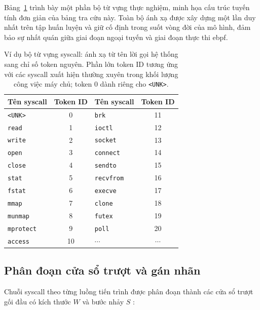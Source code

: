 \documentclass[../main.tex]{subfiles}
\begin{document}
Bảng~\ref{tab:vocab} trình bày một phần bộ từ vựng thực nghiệm, minh
họa cấu trúc
tuyến tính đơn giản của bảng tra cứu này. Toàn bộ ánh xạ được xây
dựng một lần duy
nhất trên tập huấn luyện và giữ cố định trong suốt vòng đời của mô
hình, đảm bảo sự
nhất quán giữa giai đoạn ngoại tuyến và giai đoạn thực thi \gls{ebpf}.

\begin{table}[H]
  \caption{Ví dụ bộ từ vựng syscall: ánh xạ từ tên lời gọi hệ thống
    sang chỉ số token
    nguyên. Phần lớn token ID tương ứng với các syscall xuất hiện
    thường xuyên trong
  khối lượng công việc máy chủ; token 0 dành riêng cho \texttt{<UNK>}.}
  \label{tab:vocab}
  \centering
  \begin{tabular}{|l|c||l|c|}
    \hline
    \textbf{Tên \gls{syscall}} & \textbf{Token ID} &
    \textbf{Tên \gls{syscall}} & \textbf{Token ID} \\ \hline
    \texttt{<UNK>}    & 0  & \texttt{brk}       & 11 \\ \hline
    \texttt{read}     & 1  & \texttt{ioctl}     & 12 \\ \hline
    \texttt{write}    & 2  & \texttt{socket}    & 13 \\ \hline
    \texttt{open}     & 3  & \texttt{connect}   & 14 \\ \hline
    \texttt{close}    & 4  & \texttt{sendto}    & 15 \\ \hline
    \texttt{stat}     & 5  & \texttt{recvfrom}  & 16 \\ \hline
    \texttt{fstat}    & 6  & \texttt{execve}    & 17 \\ \hline
    \texttt{mmap}     & 7  & \texttt{clone}     & 18 \\ \hline
    \texttt{munmap}   & 8  & \texttt{futex}     & 19 \\ \hline
    \texttt{mprotect} & 9  & \texttt{poll}      & 20 \\ \hline
    \texttt{access}   & 10 & $\cdots$           & $\cdots$ \\ \hline
  \end{tabular}
\end{table}

\subsection{Phân đoạn cửa sổ trượt và gán nhãn}
\label{sec:windowing}

Chuỗi \gls{syscall} theo từng luồng tiến trình được phân đoạn thành các cửa
sổ trượt gối đầu
có kích thước $W$ và bước nhảy $S$ \cite{grimmer2022improving}:
\end{document}
